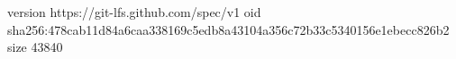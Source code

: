version https://git-lfs.github.com/spec/v1
oid sha256:478cab11d84a6caa338169c5edb8a43104a356c72b33c5340156e1ebecc826b2
size 43840
